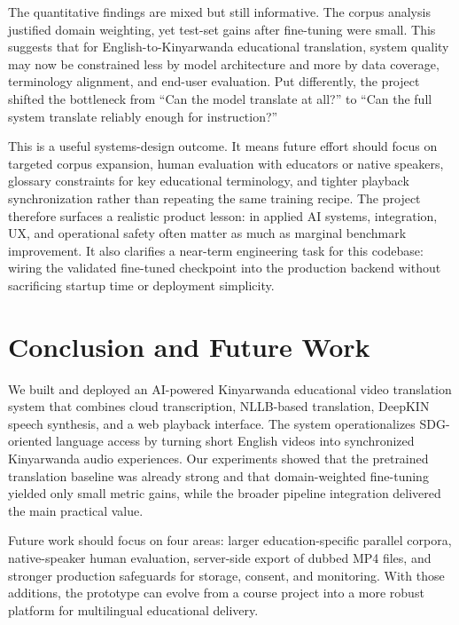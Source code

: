 \documentclass[conference]{IEEEtran}
\begin{document}
The quantitative findings are mixed but still informative. The corpus analysis justified domain weighting, yet test-set gains after fine-tuning were small. This suggests that for English-to-Kinyarwanda educational translation, system quality may now be constrained less by model architecture and more by data coverage, terminology alignment, and end-user evaluation. Put differently, the project shifted the bottleneck from ``Can the model translate at all?'' to ``Can the full system translate reliably enough for instruction?''

This is a useful systems-design outcome. It means future effort should focus on targeted corpus expansion, human evaluation with educators or native speakers, glossary constraints for key educational terminology, and tighter playback synchronization rather than repeating the same training recipe. The project therefore surfaces a realistic product lesson: in applied AI systems, integration, UX, and operational safety often matter as much as marginal benchmark improvement. It also clarifies a near-term engineering task for this codebase: wiring the validated fine-tuned checkpoint into the production backend without sacrificing startup time or deployment simplicity.

\section{Conclusion and Future Work}
We built and deployed an AI-powered Kinyarwanda educational video translation system that combines cloud transcription, NLLB-based translation, DeepKIN speech synthesis, and a web playback interface. The system operationalizes SDG-oriented language access by turning short English videos into synchronized Kinyarwanda audio experiences. Our experiments showed that the pretrained translation baseline was already strong and that domain-weighted fine-tuning yielded only small metric gains, while the broader pipeline integration delivered the main practical value.

Future work should focus on four areas: larger education-specific parallel corpora, native-speaker human evaluation, server-side export of dubbed MP4 files, and stronger production safeguards for storage, consent, and monitoring. With those additions, the prototype can evolve from a course project into a more robust platform for multilingual educational delivery.



\end{document}
